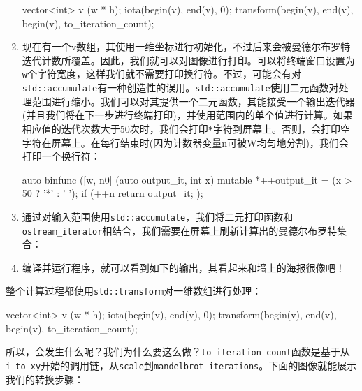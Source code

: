 \begin{enumerate}
\begin{codebox}[cpp]
vector<int> v (w * h);
iota(begin(v), end(v), 0);
transform(begin(v), end(v), begin(v), to_iteration_count);
\end{codebox}

\item 现在有一个v数组，其使用一维坐标进行初始化，不过后来会被曼德尔布罗特迭代计数所覆盖。因此，我们就可以对图像进行打印。可以将终端窗口设置为\texttt{w}个字符宽度，这样我们就不需要打印换行符。不过，可能会有对\texttt{std::accumulate}有一种创造性的误用。\texttt{std::accumulate}使用二元函数对处理范围进行缩小。我们可以对其提供一个二元函数，其能接受一个输出迭代器(并且我们将在下一步进行终端打印)，并使用范围内的单个值进行计算。如果相应值的迭代次数大于50次时，我们会打印\texttt{*}字符到屏幕上。否则，会打印空字符在屏幕上。在每行结束时(因为计数器变量n可被W均匀地分割)，我们会打印一个换行符：

\begin{codebox}[cpp]
auto binfunc ([w, n{0}] (auto output_it, int x) mutable {
    *++output_it = (x > 50 ? '*' : ' ');
    if (++n %
    return output_it;
});
\end{codebox}

\item 通过对输入范围使用\texttt{std::accumulate}，我们将二元打印函数和\texttt{ostream\_iterator}相结合，我们需要在屏幕上刷新计算出的曼德尔布罗特集合：

\begin{codebox}[cpp]
    accumulate(begin(v), end(v), ostream_iterator<char>{cout},
              binfunc);
}
\end{codebox}

\item 编译并运行程序，就可以看到如下的输出，其看起来和墙上的海报很像吧！

\end{enumerate}



整个计算过程都使用\texttt{std::transform}对一维数组进行处理：

\begin{codebox}[cpp]
vector<int> v (w * h);
iota(begin(v), end(v), 0);
transform(begin(v), end(v), begin(v), to_iteration_count);
\end{codebox}

所以，会发生什么呢？我们为什么要这么做？\texttt{to\_iteration\_count}函数是基于从\texttt{i\_to\_xy}开始的调用链，从\texttt{scale}到\texttt{mandelbrot\_iterations}。下面的图像就能展示我们的转换步骤：

